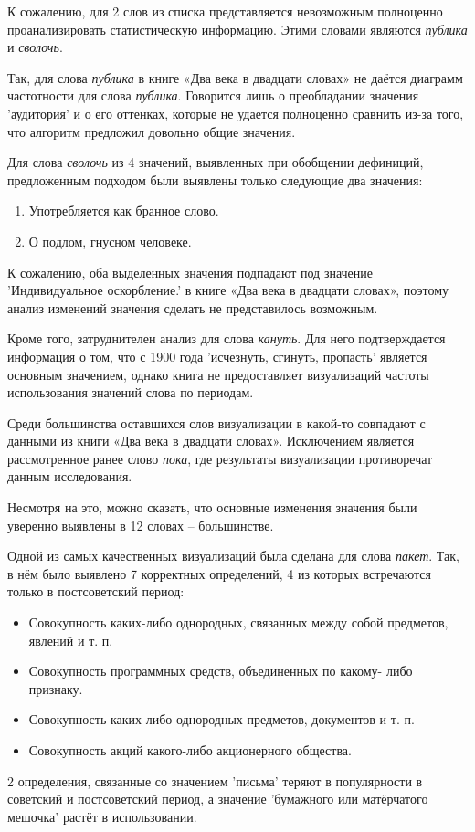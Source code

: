 \documentclass[LI,VKR]{HSEUniversity}
\begin{document}
К сожалению, для 2 слов из списка представляется невозможным полноценно проанализировать
статистическую информацию.
Этими словами являются \textit{публика} и \textit{сволочь}.

Так, для слова \textit{публика} в книге «Два века в двадцати словах» не даётся
диаграмм частотности для слова \textit{публика}.
Говорится лишь о преобладании значения ’аудитория’ и о его оттенках,
которые не удается полноценно сравнить из-за того, что алгоритм предложил довольно общие значения.

Для слова \textit{сволочь} из 4 значений, выявленных при обобщении дефиниций,
предложенным подходом были выявлены только следующие два значения:
\begin{enumerate}
    \item Употребляется как бранное слово.
    \item О подлом, гнусном человеке.
\end{enumerate}

К сожалению, оба выделенных значения подпадают под значение ’Индивидуальное оскорбление.’
в книге «Два века в двадцати словах», поэтому анализ изменений значения
сделать не представилось возможным.

Кроме того, затруднителен анализ для слова \textit{кануть}.
Для него подтверждается информация о том, что с 1900 года ’исчезнуть, сгинуть, пропасть’ является
основным значением, однако книга не предоставляет визуализаций частоты
использования значений слова по периодам.

Среди большинства оставшихся слов визуализации в какой-то совпадают с данными из книги «Два века в двадцати словах».
Исключением является рассмотренное ранее слово \textit{пока}, где результаты визуализации противоречат
данным исследования.

Несмотря на это, можно сказать, что основные изменения значения были уверенно
выявлены в 12 словах – большинстве.

Одной из самых качественных визуализаций была сделана для слова \textit{пакет}.
Так, в нём было выявлено 7 корректных определений,
4 из которых встречаются только в постсоветский период:
\begin{itemize}
    \item Совокупность каких-либо однородных, связанных между собой
предметов, явлений и т. п.
    \item Совокупность программных средств, объединенных по какому-
либо признаку.
    \item Совокупность каких-либо однородных предметов, документов и т.
п.
    \item Совокупность акций какого-либо акционерного общества.
\end{itemize}
2 определения, связанные со значением ’письма’ теряют в популярности в советский и постсоветский период,
а значение ’бумажного или матёрчатого мешочка’ растёт в использовании.
\end{document}
